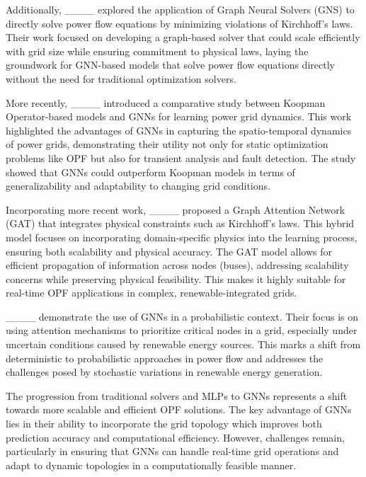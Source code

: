 Additionally, ____ explored the application of Graph Neural Solvers (GNS) to directly solve power flow equations by minimizing violations of Kirchhoff’s laws. Their work focused on developing a graph-based solver that could scale efficiently with grid size while ensuring commitment to physical laws, laying the groundwork for GNN-based models that solve power flow equations directly without the need for traditional optimization solvers.

More recently, ____ introduced a comparative study between Koopman Operator-based models and GNNs for learning power grid dynamics. This work highlighted the advantages of GNNs in capturing the spatio-temporal dynamics of power grids, demonstrating their utility not only for static optimization problems like OPF but also for transient analysis and fault detection. The study showed that GNNs could outperform Koopman models in terms of generalizability and adaptability to changing grid conditions.

Incorporating more recent work, ____ proposed a Graph Attention Network (GAT) that integrates physical constraints such as Kirchhoff's laws. This hybrid model focuses on incorporating domain-specific physics into the learning process, ensuring both scalability and physical accuracy. The GAT model allows for efficient propagation of information across nodes (buses), addressing scalability concerns while preserving physical feasibility. This makes it highly suitable for real-time OPF applications in complex, renewable-integrated grids.

____ demonstrate the use of GNNs in a probabilistic context. Their focus is on using attention mechanisms to prioritize critical nodes in a grid, especially under uncertain conditions caused by renewable energy sources. This marks a shift from deterministic to probabilistic approaches in power flow and addresses the challenges posed by stochastic variations in renewable energy generation.

The progression from traditional solvers and MLPs to GNNs represents a shift towards more scalable and efficient OPF solutions. The key advantage of GNNs lies in their ability to incorporate the grid topology which improves both prediction accuracy and computational efficiency. However, challenges remain, particularly in ensuring that GNNs can handle real-time grid operations and adapt to dynamic topologies in a computationally feasible manner.